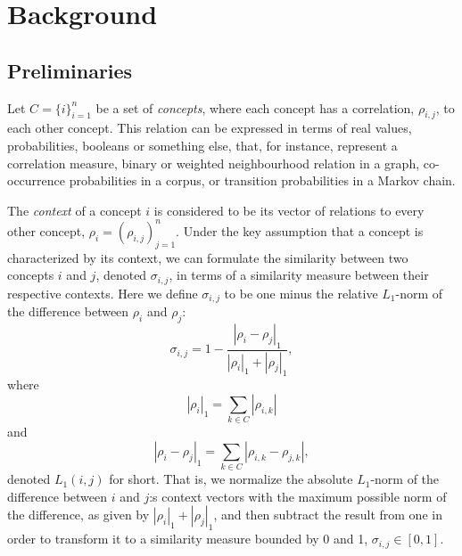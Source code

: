 \documentclass{sig-alternate}
\newcommand{\comment}[1]{{\small \color{red} {#1}} \normalcolor}
\newcommand{\rn}[1]{\rho_{#1}}
\newcommand{\rns}[1]{|\rn{#1}|_1}
\newcommand{\sy}[1]{\sigma_{#1}}
\newcommand{\nm}[1]{L_1(#1)}
\newcommand{\dnm}[2]{|\rn{#1}-\rn{#2}|_1}
\begin{document}
\section{Background}

\subsection{Preliminaries}
\label{sec:preliminaries}

Let $C = \{i\}_{i=1}^n$ be a set of \emph{concepts}, where each concept has a correlation, $\rn{i,j}$, to
each other concept. This relation can be expressed in terms of real values, probabilities, booleans or something
else, that, for instance, represent a correlation measure, binary or weighted neighbourhood relation in a graph,
co-occurrence probabilities in a corpus, or transition probabilities in a Markov chain.

The \emph{context} of a concept $i$ is considered to be its vector of relations to every other concept, $\rn{i} =
(\rn{i,j})_{j=1}^n$. Under the key assumption that a concept is characterized by its context, we can formulate the
similarity between two concepts $i$ and $j$, denoted $\sy{i,j}$, in terms of a similarity measure between their
respective contexts.
Here we define $\sy{i,j}$ to be one minus the relative $L_1$-norm of the difference between $\rn{i}$ and $\rn{j}$:
\begin{equation}\label{eq:sim}
\sy{i,j} = 1 - \frac{\dnm{i}{j}}{\rns{i} + \rns{j}},
\end{equation}
where
\begin{equation}\label{eq:totrel}
\rns{i} = \sum_{k \in C} | \rn{i,k}|
\end{equation}
and
\begin{equation}\label{}
\dnm{i}{j} =  \sum_{k \in C} | \rn{i,k} - \rn{j,k} |,
\end{equation}
denoted $\nm{i,j}$ for short.
That is, we normalize the absolute $L_1$-norm of the difference between $i$ and $j$:s context vectors with the maximum
possible norm of the difference, as given by $\rns{i} + \rns{j}$, and then subtract the result from one in order to
transform it to a similarity measure bounded by 0 and 1, $\sy{i,j} \in [0, 1]$.%
\end{document}
